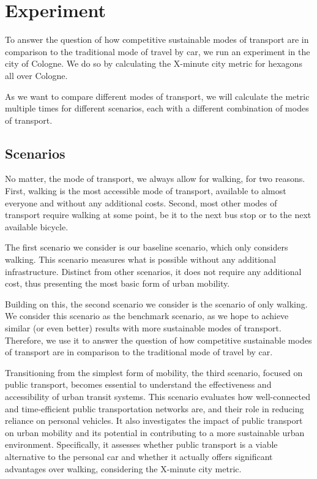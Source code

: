 \clearpage
\section{Experiment}
\label{sec:experiment}

To answer the question of how competitive sustainable modes of transport are in comparison to the traditional mode of travel by car, we run an experiment in the city of Cologne.
We do so by calculating the X-minute city metric for hexagons all over Cologne.

As we want to compare different modes of transport, we will calculate the metric multiple times for different scenarios, each with a different combination of modes of transport.

\subsection{Scenarios}
\label{subs:scenarios}

No matter, the mode of transport, we always allow for walking, for two reasons.
First, walking is the most accessible mode of transport, available to almost everyone and without any additional costs.
Second, most other modes of transport require walking at some point, be it to the next bus stop or to the next available bicycle.

The first scenario we consider is our baseline scenario, which only considers walking.
This scenario measures what is possible without any additional infrastructure. 
Distinct from other scenarios, it does not require any additional cost, thus presenting the most basic form of urban mobility.

Building on this, the second scenario we consider is the scenario of only walking. 
We consider this scenario as the benchmark scenario, as we hope to achieve similar (or even better) results with more sustainable modes of transport.
Therefore, we use it to answer the question of how competitive sustainable modes of transport are in comparison to the traditional mode of travel by car. 

Transitioning from the simplest form of mobility, the third scenario, focused on public transport, becomes essential to understand the effectiveness and accessibility of urban transit systems. 
This scenario evaluates how well-connected and time-efficient public transportation networks are, and their role in reducing reliance on personal vehicles. 
It also investigates the impact of public transport on urban mobility and its potential in contributing to a more sustainable urban environment. 
Specifically, it assesses whether public transport is a viable alternative to the personal car and whether it actually offers significant advantages over walking, considering the X-minute city metric.

